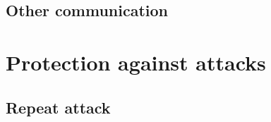 \subsection{Other communication}
\label{subsec:other_phase}


\section{Protection against attacks}
\label{sec:attacks_protection}


\subsection{Repeat attack}
\label{subsec:repeat attack}


